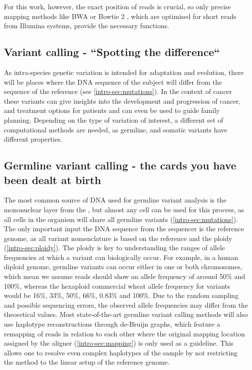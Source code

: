 For this work, however, the exact position of reads is crucial, so only precise mapping methods like BWA \cite{Li2013} or Bowtie 2 \cite{Langmead2018}, which are optimised for short reads from Illumina systems, provide the necessary functions.


\subsection[Variant calling]{Variant calling - ``Spotting the difference``}
\label{intro-sec:variantcalling}
As intra-species genetic variation is intended for adaptation and evolution, there will be places where the DNA sequence of the subject will differ from the sequence of the reference (see \autoref{intro-sec:mutations}). In the context of cancer these variants can give insights into the development and progression of cancer, and treatment options for patients and can even be used to guide family planning. Depending on the type of variation of interest, a different set of computational methods are needed, as germline, and somatic variants have different properties.

\subsection[Germline]{Germline variant calling - the cards you have been dealt at birth}
\label{intro-sec:germlinecalling}
The most common source of DNA used for germline variant analysis is the mononuclear layer from the , but almost any cell can be used for this process, as all cells in the organism will share all germline variants (\autoref{intro-sec:mutations}). The only important input  the DNA sequence from the sequencer is the  reference genome, as all variant nomenclature is based on the reference and the ploidy (\autoref{intro-sec:ploidy}). The ploidy is key to understanding the ranges of allele frequencies at which a variant can biologically occur. For example, in a human diploid genome, germline variants can occur either in one or both chromosomes, which mean we assume reads should show an allele frequency of around 50\% and 100\%, whereas the hexaploid commercial wheat \cite{Mayer2014} allele frequency for variants would be 16\%, 33\%, 50\%, 66\%, 0.83\% and 100\%. Due to the random sampling and possible sequencing errors, the observed allele frequencies may differ from the theoretical values. 
Most state-of-the-art germline variant calling methods will also use haplotype reconstructions through de-Bruijn graphs, which feature a remapping of reads in relation to each other \cite{Garrison2012,Lai2016,Kim2018,Benjamin2019,Cooke2021} where the original mapping location assigned by the aligner (\autoref{intro-sec:mapping}) is only used as a guideline. This  allows one to resolve even complex haplotypes of the sample by not restricting the method to the linear setup of the reference genome.


